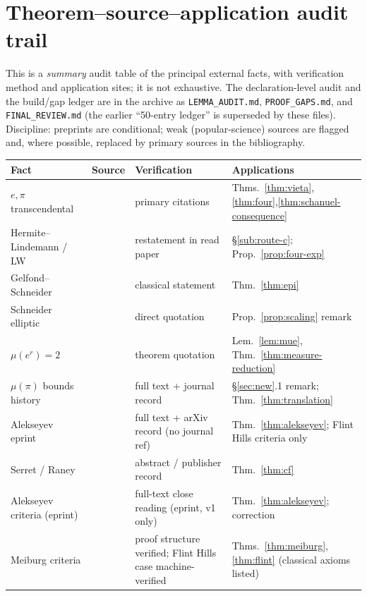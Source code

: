 \documentclass[11pt]{amsart}
\theoremstyle{definition}
\theoremstyle{remark}
\numberwithin{equation}{section}
\newcommand{\irr}{\mu}
\newcommand{\ee}{e}
\begin{document}
\section{Theorem--source--application audit trail}\label{app:audit}

This is a \emph{summary} audit table of the principal external facts, with verification method and application sites; it is not exhaustive. The declaration-level audit and the build/gap ledger are in the archive as \texttt{LEMMA\_AUDIT.md}, \texttt{PROOF\_GAPS.md}, and \texttt{FINAL\_REVIEW.md} (the earlier ``50-entry ledger'' is superseded by these files). Discipline: preprints are conditional; weak (popular-science) sources are flagged and, where possible, replaced by primary sources in the bibliography.

\begin{center}
\footnotesize\begin{tabularx}{\textwidth}{@{}p{}p{}p{}X@{}}
\toprule
Fact & Source & Verification & Applications \\
\midrule
$\ee,\pi$ transcendental & \cite{Hermite1873,Lindemann1882} & primary citations & Thms.~\ref{thm:vieta},\ref{thm:four},\ref{thm:schanuel-consequence} \\
Hermite--Lindemann / LW & \cite{Lindemann1882,Bertolin2026} & restatement in read paper & \S\ref{sub:route-c}; Prop.~\ref{prop:four-exp} \\
Gelfond--Schneider & \cite{GS1934} & classical statement & Thm.~\ref{thm:epi} \\
Schneider elliptic & \cite{Duke} & direct quotation & Prop.~\ref{prop:scaling} remark \\
$\irr(\ee^r)=2$ & \cite{CNU2024} & theorem quotation & Lem.~\ref{lem:mue}, Thm.~\ref{thm:measure-reduction} \\
$\irr(\pi)$ bounds history & \cite{ZZ2020} & full text + journal record & \S\ref{sec:new}.1 remark; Thm.~\ref{thm:translation} \\
Alekseyev eprint & \cite{Alekseyev2011} & full text + arXiv record (no journal ref) & Thm.~\ref{thm:alekseyev}; Flint Hills criteria only \\
Serret / Raney & \cite{Panti2017,Raney1973} & abstract / publisher record & Thm.~\ref{thm:cf} \\
Alekseyev criteria (eprint) & \cite{Alekseyev2011} & full-text close reading (eprint, v1 only) & Thm.~\ref{thm:alekseyev}; correction \\
Meiburg criteria & \cite{Meiburg2022} & proof structure verified; Flint Hills case machine-verified & Thms.~\ref{thm:meiburg},\ref{thm:flint} (classical axioms listed) \\

\end{tabularx}
\end{center}
\end{document}
